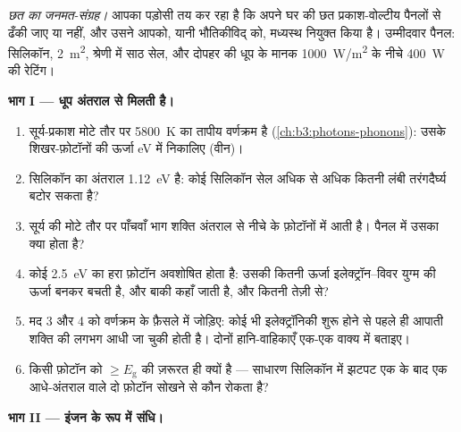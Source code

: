 \begin{problem}\label{pb:b3:electrons-in-solids:1}
\emph{छत का जनमत-संग्रह।} आपका पड़ोसी तय कर रहा है कि अपने घर की छत
प्रकाश-वोल्टीय पैनलों से ढँकी जाए या नहीं, और उसने आपको, यानी
भौतिकीविद् को, मध्यस्थ नियुक्त किया है। उम्मीदवार पैनल: सिलिकॉन,
\qty{2}{m^2}, श्रेणी में साठ सेल, और दोपहर की धूप के मानक
\qty{1000}{W/m^2} के नीचे \qty{400}{W} की रेटिंग।

\medskip\noindent\textbf{भाग I --- धूप अंतराल से मिलती है।}

\begin{enumerate}
  \item सूर्य-प्रकाश मोटे तौर पर \qty{5800}{K} का तापीय वर्णक्रम है
        (\cref{ch:b3:photons-phonons}): उसके शिखर-फ़ोटॉनों की ऊर्जा
        eV में निकालिए (वीन)।
  \item सिलिकॉन का अंतराल \qty{1.12}{eV} है: कोई सिलिकॉन सेल
        अधिक से अधिक कितनी लंबी तरंगदैर्घ्य बटोर सकता है?
  \item सूर्य की मोटे तौर पर पाँचवाँ भाग शक्ति अंतराल से नीचे के
        फ़ोटॉनों में आती है। पैनल में उसका क्या होता है?
  \item कोई \qty{2.5}{eV} का हरा फ़ोटॉन अवशोषित होता है: उसकी कितनी
        ऊर्जा इलेक्ट्रॉन--विवर युग्म की ऊर्जा बनकर बचती है, और बाकी
        कहाँ जाती है, और कितनी तेज़ी से?
  \item मद 3 और 4 को वर्णक्रम के फ़ैसले में जोड़िए: कोई भी
        इलेक्ट्रॉनिकी शुरू होने से पहले ही आपाती शक्ति की लगभग आधी
        जा चुकी होती है। दोनों हानि-वाहिकाएँ एक-एक वाक्य में बताइए।
  \item किसी फ़ोटॉन को $\ge E_{\text{g}}$ की ज़रूरत ही क्यों है ---
        साधारण सिलिकॉन में झटपट एक के बाद एक आधे-अंतराल वाले दो
        फ़ोटॉन सोखने से कौन रोकता है?
\end{enumerate}

\medskip\noindent\textbf{भाग II --- इंजन के रूप में संधि।}


\end{problem}
